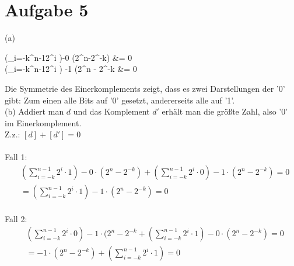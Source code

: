 \documentclass[a4paper,
  twoside, %
  headlines=2.1 %
  ]{scrartcl}
\begin{document}
\section*{Aufgabe 5}
		(a)\begin{flalign*}
			(\sum_{i=-k}^{n-1}2^i )-0 \cdot (2^n-2^{-k}) &= 0 \\
			(\sum_{i=-k}^{n-1}2^i ) -1 \cdot (2^n - 2^{-k} &= 0
		\end{flalign*}
		Die Symmetrie des Einerkomplements zeigt, dass es zwei Darstellungen der '0' gibt: Zum einen alle Bits auf '0' gesetzt, andererseits alle auf '1'. \\
		(b) Addiert man $d$ und das Komplement $d'$ erhält man die größte Zahl, also '0' im Einerkomplement. \\
		Z.z.: $[d]+[d'] = 0$ \\\\
		Fall 1: \\
		\begin{align*}
			&(\sum_{i=-k}^{n-1}2^i \cdot 1)-0\cdot (2^n-2^{-k})+(\sum_{i=-k}^{n-1}2^i \cdot 0) -1 \cdot (2^n - 2^{-k}) =0 \\
			&= (\sum_{i=-k}^{n-1}2^i \cdot 1) -1 \cdot (2^n - 2^{-k}) = 0
		\end{align*} \\
		Fall 2:\\
		\begin{align*}
			&(\sum_{i=-k}^{n-1}2^i \cdot 0)-1 \cdot (2^n-2^{-k}+(\sum_{i=-k}^{n-1}2^i \cdot 1)-0\cdot(2^n-2^{-k}) = 0 \\ 
			&=-1\cdot(2^n-2^{-k}) +(\sum_{i=-k}^{n-1}2^i \cdot 1) = 0
		\end{align*}
		
\end{document}
